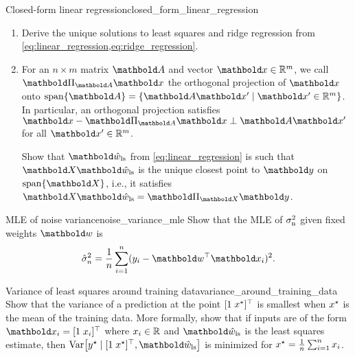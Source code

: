 \excheading

\begin{nexercise}{Closed-form linear regression}{closed_form_linear_regression}
  \begin{enumerate}
    \item Derive the unique solutions to least squares and ridge regression from \cref{eq:linear_regression,eq:ridge_regression}.

    \item For an $n \times m$ matrix $\mA$ and vector $\vx \in \R^m$, we call $\mPi_{\mA} \vx$ the orthogonal projection of $\vx$ onto $\mathrm{span}\{\mA\} = \{\mA \vxp \mid \vxp \in \R^m\}$.
    In particular, an orthogonal projection satisfies $\vx - \mPi_{\mA} \vx \perp \mA \vxp$ for all $\vxp \in \R^m$.\par
    Show that $\vwhat_{\ls}$ from \cref{eq:linear_regression} is such that $\mX \vwhat_{\ls}$ is the unique closest point to $\vy$ on $\mathrm{span}\{\mX\}$, i.e., it satisfies $\mX \vwhat_{\ls} = \mPi_{\mX} \vy$.
  \end{enumerate}
\end{nexercise}

\begin{nexercise}{MLE of noise variance}{noise_variance_mle}
  Show that the MLE of $\sigma_{\mathrm{n}}^2$ given fixed weights $\vw$ is \begin{align}
    \hat{\sigma}_n^2 = \frac{1}{n} \sum_{i=1}^n (y_i - \transpose{\vw} \vx_i)^2.
  \end{align}
\end{nexercise}

\begin{nexercise}{Variance of least squares around training data}{variance_around_training_data}
  Show that the variance of a prediction at the point $[1 \; x^\star]^\top$ is smallest when $x^\star$ is the mean of the training data.
  More formally, show that if inputs are of the form $\vx_i = \transpose{[1 \; x_i]}$ where $x_i \in \mathbb{R}$ and $\vwhat_{\ls}$ is the least squares estimate, then $\Var{\ys \mid \transpose{[1 \; \xs]}, \vwhat_{\ls}}$ is minimized for $x^\star = \frac{1}{n} \sum_{i=1}^n x_i$.
\end{nexercise}

